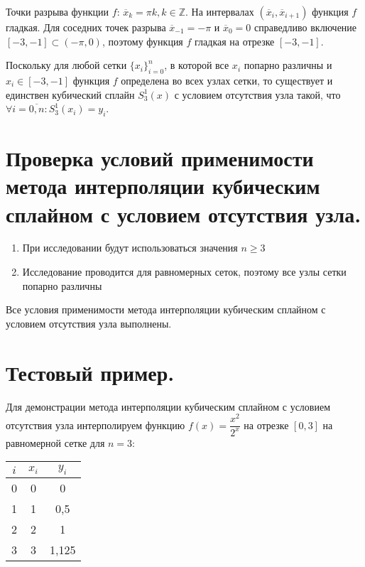 \documentclass[a4paper, 12pt]{article}
\begin{document}
	Точки разрыва функции $f$: $\overline{x}_k=\pi k,k\in\mathbb{Z}$. На интервалах $(\overline{x}_{i}, \overline{x}_{i+1})$ функция $f$ гладкая. Для соседних точек разрыва $\overline{x}_{-1}=-\pi$ и $\overline{x}_{0}=0$ справедливо включение $[-3,-1]\subset(-\pi,0)$, поэтому функция $f$ гладкая на отрезке $[-3,-1]$.
	
	Поскольку для любой сетки $\{x_i\}_{i=0}^n$, в которой все $x_i$ попарно различны и $x_i\in[-3,-1]$ функция $f$ определена во всех узлах сетки, то существует и единствен кубический сплайн $S_3^1(x)$ с условием отсутствия узла такой, что $\forall i=\overline{0,n} : S_3^1(x_i)=y_i$.
	
	\section{Проверка условий применимости метода интерполяции кубическим сплайном с условием отсутствия узла.}
	
	\begin{enumerate}
		\item При исследовании будут использоваться значения $n\geq 3$
		\item Исследование проводится для равномерных сеток, поэтому все узлы сетки попарно различны
	\end{enumerate}
	
	Все условия применимости метода интерполяции кубическим сплайном с условием отсутствия узла выполнены.
	
	\section{Тестовый пример.}
	
	Для демонстрации метода интерполяции кубическим сплайном с условием отсутствия узла интерполируем функцию $f(x)=\dfrac{x^2}{2^x}$ на отрезке $[0,3]$ на равномерной сетке для $n=3$:
	\begin{center}
		\begin{tabular}{ | c | c | c | }
			\hline
			$i$ & $x_i$ & $y_i$ \\ \hline
			0 & 0 & 0 \\ \hline
			1 & 1 & 0,5 \\ \hline
			2 & 2 & 1 \\ \hline
			3 & 3 & 1,125 \\
			\hline
		\end{tabular}
	\end{center}
\end{document}
